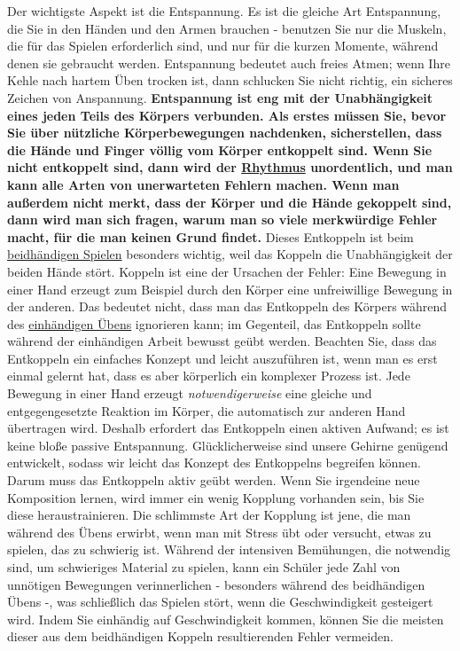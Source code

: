 Der wichtigste Aspekt ist die Entspannung.
Es ist die gleiche Art Entspannung, die Sie in den Händen und den Armen brauchen - benutzen Sie nur die Muskeln, die für das Spielen erforderlich sind, und nur für die kurzen Momente, während denen sie gebraucht werden.
Entspannung bedeutet auch freies Atmen; wenn Ihre Kehle nach hartem Üben trocken ist, dann schlucken Sie nicht richtig, ein sicheres Zeichen von Anspannung.
\textbf{Entspannung ist eng mit der Unabhängigkeit eines jeden Teils des Körpers verbunden.
Als erstes müssen Sie, bevor Sie über nützliche Körperbewegungen nachdenken, sicherstellen, dass die Hände und Finger völlig vom Körper entkoppelt sind.
Wenn Sie nicht entkoppelt sind, dann wird der \hyperlink{c1iii1b}{Rhythmus} unordentlich, und man kann alle Arten von unerwarteten Fehlern machen.
Wenn man außerdem nicht merkt, dass der Körper und die Hände gekoppelt sind, dann wird man sich fragen, warum man so viele merkwürdige Fehler macht, für die man keinen Grund findet.}
Dieses Entkoppeln ist beim \hyperlink{c1ii25}{beidhändigen Spielen} besonders wichtig, weil das Koppeln die Unabhängigkeit der beiden Hände stört.
Koppeln ist eine der Ursachen der Fehler: Eine Bewegung in einer Hand erzeugt zum Beispiel durch den Körper eine unfreiwillige Bewegung in der anderen.
Das bedeutet nicht, dass man das Entkoppeln des Körpers während des \hyperlink{c1ii7}{einhändigen Übens} ignorieren kann; im Gegenteil, das Entkoppeln sollte während der einhändigen Arbeit bewusst geübt werden.
Beachten Sie, dass das Entkoppeln ein einfaches Konzept und leicht auszuführen ist, wenn man es erst einmal gelernt hat, dass es aber körperlich ein komplexer Prozess ist.
Jede Bewegung in einer Hand erzeugt \textit{notwendigerweise} eine gleiche und entgegengesetzte Reaktion im Körper, die automatisch zur anderen Hand übertragen wird.
Deshalb erfordert das Entkoppeln einen aktiven Aufwand; es ist keine bloße passive Entspannung.
Glücklicherweise sind unsere Gehirne genügend entwickelt, sodass wir leicht das Konzept des Entkoppelns begreifen können.
Darum muss das Entkoppeln aktiv geübt werden.
Wenn Sie irgendeine neue Komposition lernen, wird immer ein wenig Kopplung vorhanden sein, bis Sie diese heraustrainieren.
Die schlimmste Art der Kopplung ist jene, die man während des Übens erwirbt, wenn man mit Stress übt oder versucht, etwas zu spielen, das zu schwierig ist.
Während der intensiven Bemühungen, die notwendig sind, um schwieriges Material zu spielen, kann ein Schüler jede Zahl von unnötigen Bewegungen verinnerlichen - besonders während des beidhändigen Übens -, was schließlich das Spielen stört, wenn die Geschwindigkeit gesteigert wird.
Indem Sie einhändig auf Geschwindigkeit kommen, können Sie die meisten dieser aus dem beidhändigen Koppeln resultierenden Fehler vermeiden.

